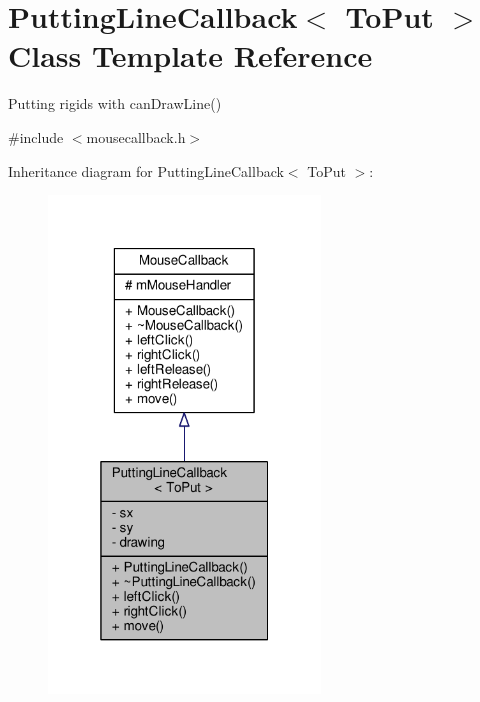 \hypertarget{classPuttingLineCallback}{}\section{Putting\+Line\+Callback$<$ To\+Put $>$ Class Template Reference}
\label{classPuttingLineCallback}


Putting rigids with can\+Draw\+Line()  




{\ttfamily \#include $<$mousecallback.\+h$>$}



Inheritance diagram for Putting\+Line\+Callback$<$ To\+Put $>$\+:
\nopagebreak
\begin{figure}[H]
\begin{center}
\leavevmode
\includegraphics[width=205pt]{classPuttingLineCallback__inherit__graph}
\end{center}
\end{figure}


